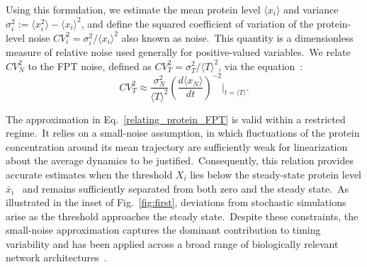 \documentclass[aps,prb,reprint,superscriptaddress]{revtex4-2}
\begin{document}
Using this formulation, we estimate the mean protein level \(\langle x_i \rangle\) and variance \(\sigma_i^2 := \langle x_i^2 \rangle - \langle x_i \rangle^2\), and define the squared coefficient of variation of the protein-level noise \(CV_i^2 = \sigma_i^2 / \langle x_i \rangle^2\) also known as noise.~This quantity is a dimensionless measure of relative noise used generally for positive-valued variables.~We relate $CV_N^2$ to the FPT noise, defined as \(CV_T^2 = \sigma_T^2 / \langle T \rangle^2\), via the equation~\cite{co2017stochastic}:
\begin{equation}\label{relating_protein_FPT}
CV_T^2 \approx \frac{\sigma_N^2}{\langle T \rangle ^2} \left( \frac{d \langle x_N \rangle}{dt} \right)^{-2} \bigg\rvert_{t = \langle T \rangle}.
\end{equation}

The approximation in Eq.~\eqref{relating_protein_FPT} is valid within a restricted regime.~It relies on a small-noise assumption, in which fluctuations of the protein concentration around its mean trajectory are sufficiently weak for linearization about the average dynamics to be justified.~Consequently, this relation provides accurate estimates when the threshold \(X_i\) lies below the steady-state protein level \(\bar{x}_i\)~\cite{co2017stochastic} and remains sufficiently separated from both zero and the steady state.~As illustrated in the inset of Fig.~\ref{fig:first}, deviations from stochastic simulations arise as the threshold approaches the steady state.~Despite these constraints, the small-noise approximation captures the dominant contribution to timing variability and has been applied across a broad range of biologically relevant network architectures~\cite{co2017stochastic,nieto2022threshold,rezaee2023optimizing, rezaee2024controlling}.






\end{document}
